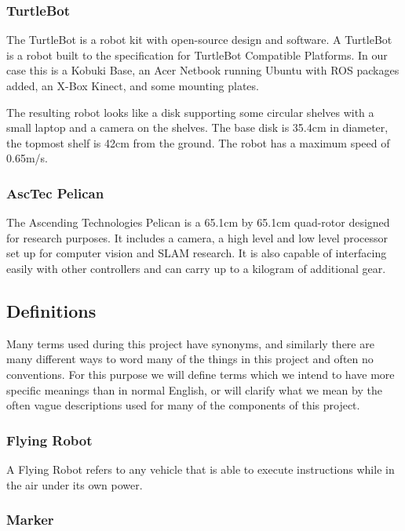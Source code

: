 \documentclass{article}
\begin{document}
		\subsubsection{TurtleBot}
		
		The TurtleBot is a robot kit with open-source design and software. A TurtleBot is a robot built to the specification for TurtleBot Compatible Platforms\cite{wise_foote_2011}. In our case this is a Kobuki Base, an Acer Netbook running Ubuntu with ROS packages added, an X-Box Kinect, and some mounting plates. 
		
		The resulting robot looks like a disk supporting some circular shelves with a small laptop and a camera on the shelves. The base disk is 35.4cm in diameter, the topmost shelf is 42cm from the ground. The robot has a maximum speed of 0.65m/s. 
		
		\subsubsection{AscTec Pelican}
		
		The Ascending Technologies Pelican is a 65.1cm by 65.1cm quad-rotor  designed for research purposes\cite{asctec}. It includes a camera, a high level and low level processor set up for computer vision and SLAM research. It is also capable of interfacing easily with other controllers and can carry up to a kilogram of additional gear.
		
	\subsection{Definitions}
	
	Many terms used during this project have synonyms, and similarly there are many different ways to word many of the things in this project and often no conventions. For this purpose we will define terms which we intend to have more specific meanings than in normal English, or will clarify what we mean by the often vague descriptions used for many of the components of this project.
	
		\subsubsection{Flying Robot}
		
		A Flying Robot refers to any vehicle that is able to execute instructions while in the air under its own power.
		
		\subsubsection{Marker}
		
\end{document}
